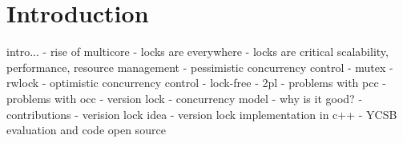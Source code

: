 \section{Introduction}
\label{s:intro}

intro...
- rise of multicore
- locks are everywhere
- locks are critical scalability, performance, resource management
- pessimistic concurrency control 
	- mutex
	- rwlock
- optimistic concurrency control
	- lock-free
	- 2pl
- problems with pcc
- problems with occ
- version lock
	- concurrency model
	- why is it good?
- contributions
	- verision lock idea
	- version lock implementation in c++
	- YCSB evaluation and code open source


